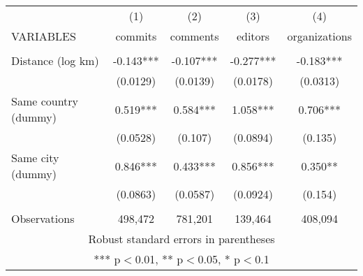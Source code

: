 \begin{tabular}{lcccc} \hline
 & (1) & (2) & (3) & (4) \\
VARIABLES & commits & comments & editors & organizations \\ \hline
 &  &  &  &  \\
Distance (log km) & -0.143*** & -0.107*** & -0.277*** & -0.183*** \\
 & (0.0129) & (0.0139) & (0.0178) & (0.0313) \\
Same country (dummy) & 0.519*** & 0.584*** & 1.058*** & 0.706*** \\
 & (0.0528) & (0.107) & (0.0894) & (0.135) \\
Same city (dummy) & 0.846*** & 0.433*** & 0.856*** & 0.350** \\
 & (0.0863) & (0.0587) & (0.0924) & (0.154) \\
 &  &  &  &  \\
 Observations & 498,472 & 781,201 & 139,464 & 408,094 \\ \hline
\multicolumn{5}{c}{ Robust standard errors in parentheses} \\
\multicolumn{5}{c}{ *** p$<$0.01, ** p$<$0.05, * p$<$0.1} \\
\end{tabular}
